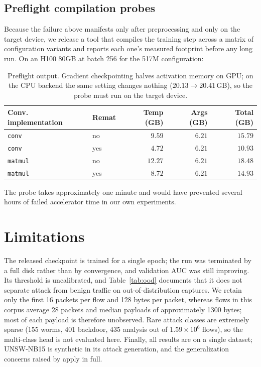 \documentclass[11pt]{article}
\begin{document}
\subsection{Preflight compilation probes}

Because the failure above manifests only after preprocessing and only on the
target device, we release a tool that compiles the training step across a matrix
of configuration variants and reports each one's measured footprint before any
long run. On an H100 80GB at batch 256 for the 517M configuration:

\begin{table}[h]
\centering
\begin{tabular}{llrrr}
\toprule
Conv. implementation & Remat & Temp (GB) & Args (GB) & Total (GB) \\
\midrule
\texttt{conv} & no & $9.59$ & $6.21$ & $15.79$ \\
\texttt{conv} & yes & $4.72$ & $6.21$ & $\mathbf{10.93}$ \\
\texttt{matmul} & no & $12.27$ & $6.21$ & $18.48$ \\
\texttt{matmul} & yes & $8.72$ & $6.21$ & $14.93$ \\
\bottomrule
\end{tabular}
\caption{Preflight output. Gradient checkpointing \citep{chen2016training}
halves activation memory on GPU; on the CPU backend the same setting changes
nothing ($20.13 \to 20.41$\,GB), so the probe must run on the target device.}
\label{tab:preflight}
\end{table}

The probe takes approximately one minute and would have prevented several hours
of failed accelerator time in our own experiments.

\section{Limitations}

The released checkpoint is trained for a single epoch; the run was terminated by
a full disk rather than by convergence, and validation AUC was still improving.
Its threshold is uncalibrated, and Table~\ref{tab:ood} documents that it does not
separate attack from benign traffic on out-of-distribution captures. We retain
only the first 16 packets per flow and 128 bytes per packet, whereas flows in
this corpus average 28 packets and median payloads of approximately 1300 bytes;
most of each payload is therefore unobserved. Rare attack classes are extremely
sparse (155 worms, 401 backdoor, 435 analysis out of $1.59\times10^6$ flows), so
the multi-class head is not evaluated here. Finally, all results are on a single
dataset; UNSW-NB15 is synthetic in its attack generation, and the
generalization concerns raised by \citet{sommer2010outside} apply in full.
\end{document}
